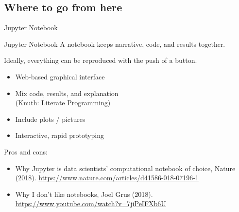 \documentclass[aspectratio=169,usenames,dvipsnames]{beamer}
\begin{document}
\subsection{Where to go from here}
\begin{frame}{Jupyter Notebook}
    \begin{block}{Jupyter Notebook}
        A notebook keeps narrative, code, and results together.

        Ideally, everything can be reproduced with the push of a button.
    \end{block}
    \begin{itemize}
        \item Web-based graphical interface
        \item Mix code, results, and explanation \\
                (Knuth: Literate Programming)
        \item Include plots / pictures
        \item Interactive, rapid prototyping
    \end{itemize}

    \pause
    Pros and cons:
    \begin{itemize}
        \item Why Jupyter is data scientists' computational notebook of choice,
            Nature (2018). \url{https://www.nature.com/articles/d41586-018-07196-1}
        \item Why I don't like notebooks, Joel Grus (2018).
            \url{https://www.youtube.com/watch?v=7jiPeIFXb6U}
    \end{itemize}
\end{frame}
\end{document}
